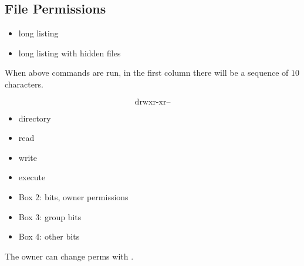 \subsection{File Permissions}

\begin{itemize}
    \item {} \textrightarrow{} long listing
    \item {} \textrightarrow{} long listing with hidden files
\end{itemize}
When above commands are run, in the first column there will be a sequence
of $ 10 $ characters.

\begin{center}
    \[
        \boxed{\text{d}}\boxed{\text{rwx}}\boxed{\text{r-x}}\boxed{\text{r--}}
    \]
\end{center}
\begin{itemize}
    \item {} \textrightarrow{} directory
    \item {} \textrightarrow{} read
    \item {} \textrightarrow{} write
    \item {} \textrightarrow{} execute
    \item Box 2:  bits, owner permissions
    \item Box 3: group bits
    \item Box 4: other bits
\end{itemize}
The owner can change perms with .


